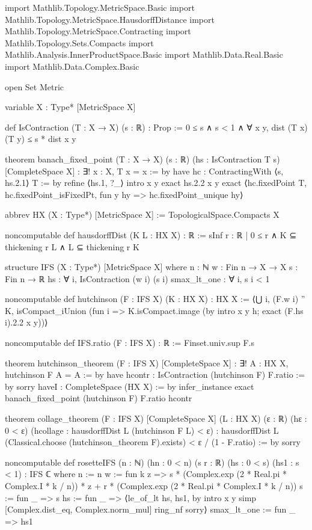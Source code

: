 \documentclass[10pt]{amsart}
\theoremstyle{break}
\begin{document}
\begin{leanlisting}
import Mathlib.Topology.MetricSpace.Basic
import Mathlib.Topology.MetricSpace.HausdorffDistance
import Mathlib.Topology.MetricSpace.Contracting
import Mathlib.Topology.Sets.Compacts
import Mathlib.Analysis.InnerProductSpace.Basic
import Mathlib.Data.Real.Basic
import Mathlib.Data.Complex.Basic

open Set Metric

variable {X : Type*} [MetricSpace X]

def IsContraction (T : X → X) (s : ℝ) : Prop :=
  0 ≤ s ∧ s < 1 ∧ ∀ x y, dist (T x) (T y) ≤ s * dist x y

theorem banach_fixed_point
    (T : X → X) (s : ℝ) (hs : IsContraction T s) [CompleteSpace X] :
    ∃! x : X, T x = x := by
  have hc : ContractingWith ⟨s, hs.2.1⟩ T := by
    refine ⟨hs.1, ?_⟩
    intro x y
    exact hs.2.2 x y
  exact ⟨hc.fixedPoint T, hc.fixedPoint_isFixedPt, fun y hy =>
    hc.fixedPoint_unique hy⟩

abbrev HX (X : Type*) [MetricSpace X] := TopologicalSpace.Compacts X

noncomputable def hausdorffDist (K L : HX X) : ℝ :=
  sInf {r : ℝ | 0 ≤ r ∧ K ⊆ thickening r L ∧ L ⊆ thickening r K}

structure IFS (X : Type*) [MetricSpace X] where
  n   : ℕ
  w   : Fin n → X → X
  s   : Fin n → ℝ
  hs  : ∀ i, IsContraction (w i) (s i)
  smax_lt_one : ∀ i, s i < 1

noncomputable def hutchinson (F : IFS X) (K : HX X) : HX X :=
  ⟨⋃ i, (F.w i) '' K, isCompact_iUnion (fun i => K.isCompact.image (by
      intro x y h; exact (F.hs i).2.2 x y))⟩

noncomputable def IFS.ratio (F : IFS X) : ℝ :=
  Finset.univ.sup F.s

theorem hutchinson_theorem
    (F : IFS X) [CompleteSpace X] :
    ∃! A : HX X, hutchinson F A = A := by
  have hcontr : IsContraction (hutchinson F) F.ratio := by
    sorry
  haveI : CompleteSpace (HX X) := by infer_instance
  exact banach_fixed_point (hutchinson F) F.ratio hcontr

theorem collage_theorem
    (F : IFS X) [CompleteSpace X]
    (L : HX X) (ε : ℝ) (hε : 0 < ε)
    (hcollage : hausdorffDist L (hutchinson F L) < ε) :
    hausdorffDist L (Classical.choose (hutchinson_theorem F).exists) < ε / (1 - F.ratio) := by
  sorry

noncomputable def rosetteIFS (n : ℕ) (hn : 0 < n) (s r : ℝ) (hs : 0 < s) (hs1 : s < 1) : IFS ℂ where
  n := n
  w := fun k z => s * (Complex.exp (2 * Real.pi * Complex.I * k / n)) * z
                    + r * (Complex.exp (2 * Real.pi * Complex.I * k / n))
  s := fun _ => s
  hs := fun _ => ⟨le_of_lt hs, hs1, by
    intro x y
    simp [Complex.dist_eq, Complex.norm_mul]
    ring_nf
    sorry⟩
  smax_lt_one := fun _ => hs1


\end{leanlisting}
\end{document}
